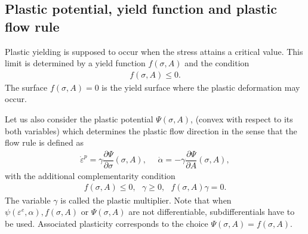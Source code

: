 \documentclass[a4paper,11pt,english]{sphinxmanual}
\begin{document}
\subsection{Plastic potential, yield function and plastic flow rule}
\label{\detokenize{userdoc/model_plasticity_small_strain:plastic-potential-yield-function-and-plastic-flow-rule}}
Plastic yielding is supposed to occur when the stress attains a critical value. This limit is determined by a yield function \(f(\sigma, A)\) and the condition
\begin{equation*}
\begin{split}f(\sigma, A) \le 0.\end{split}
\end{equation*}
The surface \(f(\sigma, A) = 0\) is the yield surface where the plastic deformation may occur.

Let us also consider the plastic potential \(\Psi(\sigma, A)\), (convex with respect to its both variables) which determines the plastic flow direction in the sense that the flow rule is defined as
\begin{equation*}
\begin{split}\dot{\varepsilon}^p = \gamma \dfrac{\partial \Psi}{\partial \sigma}(\sigma, A), ~~~~~~ \dot{\alpha} = -\gamma \dfrac{\partial \Psi}{\partial A}(\sigma, A),\end{split}
\end{equation*}
with the additional complementarity condition
\begin{equation*}
\begin{split}f(\sigma, A) \le 0, ~~~ \gamma \ge 0, ~~~ f(\sigma, A) \gamma = 0.\end{split}
\end{equation*}
The variable \(\gamma\) is called the plastic multiplier. Note that when \(\psi(\varepsilon^e, \alpha), f(\sigma, A) \mbox{ or } \Psi(\sigma, A)\) are not differentiable, subdifferentials have to be used. Associated plasticity corresponds to the choice \(\Psi(\sigma, A) = f(\sigma, A)\).
\end{document}
